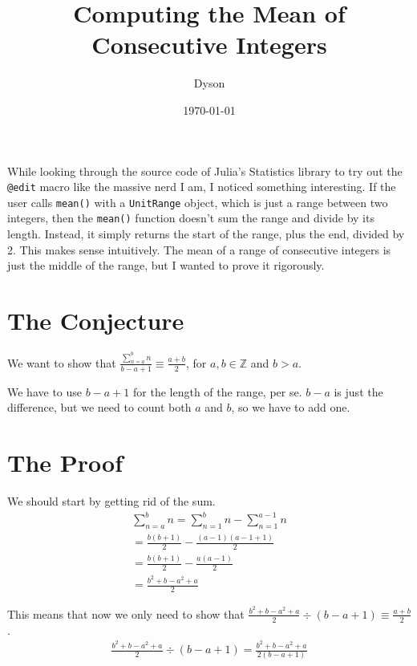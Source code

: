 \documentclass[a4paper]{article}
\title{Computing the Mean of Consecutive Integers}
\author{Dyson}
\date{\today}
\begin{document}
\maketitle

\setlength{\parindent}{0em}
\setlength{\parskip}{1em}

While looking through the source code of Julia's Statistics library to try out the \texttt{@edit} macro like the massive nerd I am, I noticed something interesting. If the user calls \texttt{mean()} with a \texttt{UnitRange} object, which is just a range between two integers, then the \texttt{mean()} function doesn't sum the range and divide by its length. Instead, it simply returns the start of the range, plus the end, divided by 2. This makes sense intuitively. The mean of a range of consecutive integers is just the middle of the range, but I wanted to prove it rigorously.

\section{The Conjecture}

We want to show that $\displaystyle \frac{\sum\limits_{n = a}^b n}{b - a + 1} \equiv \frac{a + b}{2}$, for $a, b \in \mathbb{Z}$ and $b > a$.

We have to use $b - a + 1$ for the length of the range, per se. $b - a$ is just the difference, but we need to count both $a$ and $b$, so we have to add one.

\section{The Proof}

We should start by getting rid of the sum.
\begin{gather*}
\sum_{n = a}^b n = \sum_{n = 1}^b n - \sum_{n = 1}^{a - 1} n\\[0.5em]
= \frac{b(b + 1)}{2} - \frac{(a - 1)(a - 1 + 1)}{2}\\[0.5em]
= \frac{b(b + 1)}{2} - \frac{a(a - 1)}{2}\\[0.5em]
= \frac{b^2 + b - a^2 + a}{2}
\end{gather*}

This means that now we only need to show that $\displaystyle \frac{b^2 + b - a^2 + a}{2} \div (b - a + 1) \equiv \frac{a + b}{2}$.
\begin{gather*}
\frac{b^2 + b - a^2 + a}{2} \div (b - a + 1) = \frac{b^2 + b - a^2 + a}{2(b - a + 1)}
\end{gather*}
\end{document}
